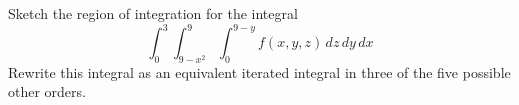 \documentclass[12pt]{exam}
\begin{document}
\begin{questions}
\question  Sketch the region of integration for the integral
    \[ \int_{0}^{3}\int_{9-x^2}^{9}\int_{0}^{9-y}f(x, y, z) \, dz\, dy\, dx \]
    Rewrite this integral as an equivalent iterated integral in three of the five possible other orders.
    \begin{solution}
\end{solution}
\end{questions}
\end{document}
